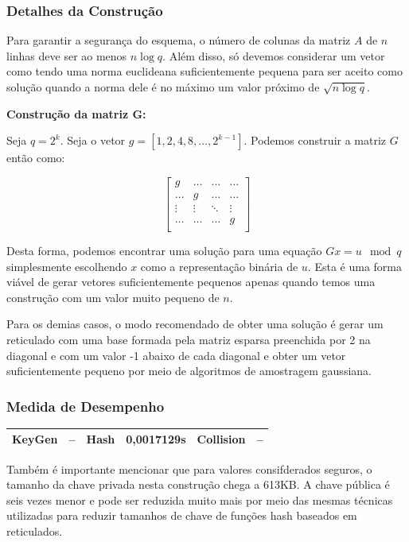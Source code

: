\documentclass[a4paper]{article}
\begin{document}
\subsubsection{Detalhes da Construção}

Para garantir a segurança do esquema, o número de colunas da matriz
$A$ de $n$ linhas deve ser ao menos $n\log q$. Além disso, só devemos
considerar um vetor como tendo uma norma euclideana suficientemente
pequena para ser aceito como solução quando a norma dele é no máximo
um valor próximo de $\sqrt{n \log q}$.

\textbf{Construção da matriz G:}

Seja $q=2^k$. Seja o vetor $g=[1, 2, 4, 8, \ldots, 2^{k-1}]$. Podemos
construir a matriz $G$ então como:

$$
\left[\begin{matrix}
    g & \ldots & \ldots & \ldots\\
    \ldots & g & \ldots & \ldots\\
    \vdots & \vdots & \ddots & \vdots\\
    \ldots & \ldots & \ldots & g\\
  \end{matrix}\right]
$$

Desta forma, podemos encontrar uma solução para uma equação $Gx=u \mod
q$ simplesmente escolhendo $x$ como a representação binária de
$u$. Esta é uma forma viável de gerar vetores suficientemente pequenos
apenas quando temos uma construção com um valor muito pequeno de $n$.

Para os demias casos, o modo recomendado de obter uma solução é gerar
um reticulado com uma base formada pela matriz esparsa preenchida por
2 na diagonal e com um valor -1 abaixo de cada diagonal e obter um
vetor suficientemente pequeno por meio de algoritmos de amostragem
gaussiana.

\subsubsection{Medida de Desempenho}

\begin{center}
\begin{tabular}{|c|c|c|c|c|c|}
  \hline
  KeyGen & -- & Hash & 0,0017129s & Collision & --\\
  \hline
\end{tabular}
\end{center}

Também é importante mencionar que para valores consifderados seguros,
o tamanho da chave privada nesta construção chega a 613KB. A chave
pública é seis vezes menor e pode ser reduzida muito mais por meio das
mesmas técnicas utilizadas para reduzir tamanhos de chave de funções
hash baseados em reticulados.
\end{document}
